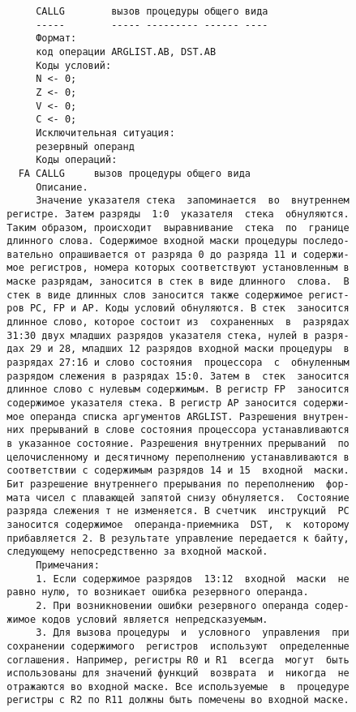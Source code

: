 \begin{verbatim}
       CALLG        вызов процедуры общего вида
       -----        ----- --------- ------ ----
       Формат:
       код операции ARGLIST.AB, DST.AB
       Коды условий:
       N <- 0;
       Z <- 0;
       V <- 0;
       C <- 0;
       Исключительная ситуация:
       резервный операнд
       Коды операций:
    FA CALLG     вызов процедуры общего вида
       Описание.
       Значение указателя стека  запоминается  во  внутреннем
  регистре. Затем разряды  1:0  указателя  стека  обнуляются.
  Таким образом, происходит  выравнивание  стека  по  границе
  длинного слова. Содержимое входной маски процедуры последо-
  вательно опрашивается от разряда 0 до разряда 11 и содержи-
  мое регистров, номера которых соответствуют установленным в
  маске разрядам, заносится в стек в виде длинного  слова.  В
  стек в виде длинных слов заносится также содержимое регист-
  ров PC, FP и AP. Коды условий обнуляются. В стек  заносится
  длинное слово, которое состоит из  сохраненных  в  разрядах
  31:30 двух младших разрядов указателя стека, нулей в разря-
  дах 29 и 28, младших 12 разрядов входной маски процедуры  в
  разрядах 27:16 и слово состояния  процессора  с  обнуленным
  разрядом слежения в разрядах 15:0. Затем в  стек  заносится
  длинное слово с нулевым содержимым. В регистр FP  заносится
  содержимое указателя стека. В регистр AP заносится содержи-
  мое операнда списка аргументов ARGLIST. Разрешения внутрен-
  них прерываний в слове состояния процессора устанавливаются
  в указанное состояние. Разрешения внутренних прерываний  по
  целочисленному и десятичному переполнению устанавливаются в
  соответствии с содержимым разрядов 14 и 15  входной  маски.
  Бит разрешение внутреннего прерывания по переполнению  фор-
  мата чисел с плавающей запятой снизу обнуляется.  Состояние
  разряда слежения т не изменяется. В счетчик  инструкций  PC
  заносится содержимое  операнда-приемника  DST,  к  которому
  прибавляется 2. В результате управление передается к байту,
  следующему непосредственно за входной маской.
       Примечания:
       1. Если содержимое разрядов  13:12  входной  маски  не
  равно нулю, то возникает ошибка резервного операнда.
       2. При возникновении ошибки резервного операнда содер-
  жимое кодов условий является непредсказуемым.
       3. Для вызова процедуры  и  условного  управления  при
  сохранении содержимого  регистров  используют  определенные
  соглашения. Например, регистры R0 и R1  всегда  могут  быть
  использованы для значений функций  возврата  и  никогда  не
  отражаются во входной маске. Все используемые  в  процедуре
  регистры с R2 по R11 должны быть помечены во входной маске.


\end{verbatim}
